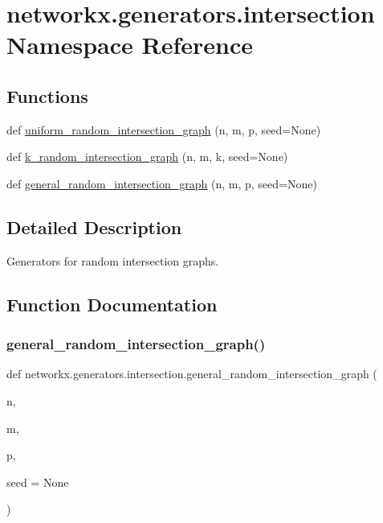 \hypertarget{namespacenetworkx_1_1generators_1_1intersection}{}\section{networkx.\+generators.\+intersection Namespace Reference}
\label{namespacenetworkx_1_1generators_1_1intersection}
\subsection*{Functions}
\begin{DoxyCompactItemize}
\item 
def \hyperlink{namespacenetworkx_1_1generators_1_1intersection_aa7d0bd0aa5c472794142b0abe0386590}{uniform\+\_\+random\+\_\+intersection\+\_\+graph} (n, m, p, seed=None)
\item 
def \hyperlink{namespacenetworkx_1_1generators_1_1intersection_af5f9931087609ac41027efa75eab9765}{k\+\_\+random\+\_\+intersection\+\_\+graph} (n, m, k, seed=None)
\item 
def \hyperlink{namespacenetworkx_1_1generators_1_1intersection_a2d2768e0a3e7cb0b9f5d9ffb7e09331c}{general\+\_\+random\+\_\+intersection\+\_\+graph} (n, m, p, seed=None)
\end{DoxyCompactItemize}


\subsection{Detailed Description}
\begin{DoxyVerb}Generators for random intersection graphs.
\end{DoxyVerb}
 

\subsection{Function Documentation}
\mbox{\label{namespacenetworkx_1_1generators_1_1intersection_a2d2768e0a3e7cb0b9f5d9ffb7e09331c}} 
\subsubsection{\texorpdfstring{general\+\_\+random\+\_\+intersection\+\_\+graph()}{general\_random\_intersection\_graph()}}
{\footnotesize\ttfamily def networkx.\+generators.\+intersection.\+general\+\_\+random\+\_\+intersection\+\_\+graph (\begin{DoxyParamCaption}\item[{}]{n,  }\item[{}]{m,  }\item[{}]{p,  }\item[{}]{seed = {\ttfamily None} }\end{DoxyParamCaption})}

